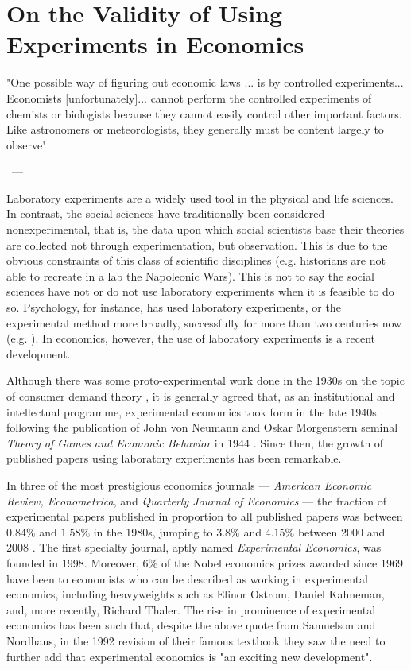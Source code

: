 \documentclass[12pt]{article}
\let\oldquote\quote
\let\endoldquote\endquote
\renewenvironment{quote}[2][]
{\if\relax\detokenize{#1}\relax
	\def\quoteauthor{#2}%
	\else
	\def\quoteauthor{#2~---~#1}%
	\fi
	\oldquote}
{\par\nobreak\smallskip\hfill\quoteauthor%
	\endoldquote\addvspace{\bigskipamount}}
\begin{document}
\section{On the Validity of Using Experiments in Economics}

\begin{quote}{\cite{Samuelson1985}}
"One possible way of figuring out economic laws ... is by controlled experiments... Economists [unfortunately]... cannot perform the controlled experiments of chemists or biologists because they cannot easily control other important factors. Like astronomers or meteorologists, they generally must be content largely to observe"
\end{quote}

Laboratory experiments are a widely used tool in the physical and life sciences. In contrast, the social sciences have traditionally been considered nonexperimental, that is, the data upon which social scientists base their theories are collected not through experimentation, but observation. This is due to the obvious constraints of this class of scientific disciplines (e.g. historians are not able to recreate in a lab the Napoleonic Wars). This is not to say the social sciences have not or do not use laboratory experiments when it is feasible to do so. Psychology, for instance, has used laboratory experiments, or the experimental method more broadly, successfully for more than two centuries now (e.g. \cite{Ebbinghaus1885}). In economics, however, the use of laboratory experiments is a recent development. 

Although there was some proto-experimental work done in the 1930s on the topic of consumer demand theory \citep{Moscati2007}, it is generally agreed that, as an institutional and intellectual programme, experimental economics took form in the late 1940s following the publication of John von Neumann and Oskar Morgenstern seminal \textit{Theory of Games and Economic Behavior} in 1944 \citep{Guala2008}. Since then, the growth of published papers using laboratory experiments has been remarkable. 

In three of the most prestigious economics journals --- \textit{American Economic Review, Econometrica}, and \textit{Quarterly Journal of Economics} --- the fraction of experimental papers published in proportion to all published papers was between $0.84\%$ and $1.58\%$ in the 1980s, jumping to $3.8\%$ and $4.15\%$ between 2000 and 2008 \citep{Falk2009}. The first specialty journal, aptly named \textit{Experimental Economics}, was founded in 1998. Moreover, $6\%$ of the Nobel economics prizes awarded since 1969 have been to economists who can be described as working in experimental economics, including heavyweights such as Elinor Ostrom, Daniel Kahneman, and, more recently, Richard Thaler. The rise in prominence of experimental economics has been such that, despite the above quote from Samuelson and Nordhaus, in the 1992 revision of their famous textbook they saw the need to further add that experimental economics is "an exciting new development"\citep[p.~5]{Samuelson1992}.
\end{document}
